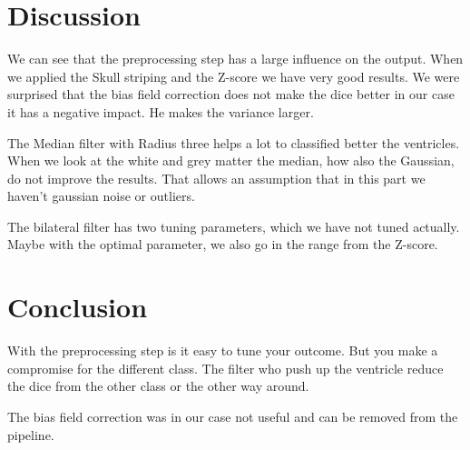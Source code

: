 \documentclass[journal]{IEEEtran}
\begin{document}
\section{Discussion}

We can see that the preprocessing step has a large influence on the output. When we applied the Skull striping and the Z-score we have very good results.
We were surprised that the bias field correction does not make the dice better in our case it has a negative impact.
He makes the variance larger.

The Median filter with Radius three helps a lot to classified better the ventricles. When we look at the white and grey matter the median, how also the Gaussian, do not improve the results. That allows an assumption that in this part we haven't gaussian noise or outliers.

The bilateral filter has two tuning parameters, which we have not tuned actually. Maybe with the optimal parameter, we also go in the range from the Z-score.


\section{Conclusion}
With the preprocessing step is it easy to tune your outcome. But you make a compromise for the different class. The filter who push up the ventricle reduce the dice from the other class or the other way around. 

The bias field correction was in our case not useful and can be removed from the pipeline. 




%
\end{document}
